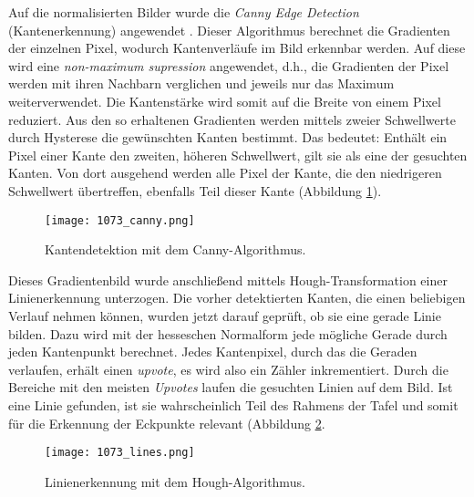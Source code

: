 Auf die normalisierten Bilder wurde die \textit{Canny Edge Detection} (Kantenerkennung) angewendet \cite{cannyedge}. Dieser Algorithmus berechnet die Gradienten der einzelnen Pixel, wodurch Kantenverläufe im Bild erkennbar werden. Auf diese wird eine \textit{non-maximum supression} angewendet, d.h., die Gradienten der Pixel werden mit ihren Nachbarn verglichen und jeweils nur das Maximum weiterverwendet. Die Kantenstärke wird somit auf die Breite von einem Pixel reduziert. Aus den so erhaltenen Gradienten werden mittels zweier Schwellwerte durch Hysterese die gewünschten Kanten bestimmt. Das bedeutet:  Enthält ein Pixel einer Kante den zweiten, höheren Schwellwert, gilt sie als eine der gesuchten Kanten. Von dort ausgehend werden alle Pixel der Kante, die den niedrigeren Schwellwert übertreffen, ebenfalls Teil dieser Kante (Abbildung \ref{fig:canny}).
\begin{figure}[h!]
\centering
\texttt{[image: 1073\_canny.png]}
\caption{Kantendetektion mit dem Canny-Algorithmus.}
\label{fig:canny}
\end{figure}

Dieses Gradientenbild wurde anschließend mittels Hough-Transformation \cite{houghpatent}{} einer Linienerkennung unterzogen. Die vorher detektierten Kanten, die einen beliebigen Verlauf nehmen können, wurden jetzt darauf geprüft, ob sie eine gerade Linie bilden. Dazu wird mit der hesseschen Normalform jede mögliche Gerade durch jeden Kantenpunkt berechnet. Jedes Kantenpixel, durch das die Geraden verlaufen, erhält einen \textit{upvote}, es wird also ein Zähler inkrementiert. Durch die Bereiche mit den meisten \textit{Upvotes} laufen die gesuchten Linien auf dem Bild. Ist eine Linie gefunden, ist sie wahrscheinlich Teil des Rahmens der Tafel und somit für die Erkennung der Eckpunkte relevant (Abbildung \ref{fig:lines}.
\begin{figure}[h!]
\centering
\texttt{[image: 1073\_lines.png]}
\caption{Linienerkennung mit dem Hough-Algorithmus.}
\label{fig:lines}
\end{figure}

